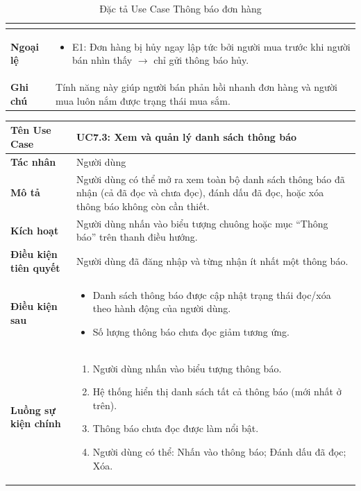 \begin{table}[H]
\begin{tabularx}{\textwidth}{|l|X|}
\begin{itemize}
\end{itemize} \\ \hline
\textbf{Ngoại lệ} & 
\begin{itemize}
    \item E1: Đơn hàng bị hủy ngay lập tức bởi người mua trước khi người bán nhìn thấy $\rightarrow$ chỉ gửi thông báo hủy.
\end{itemize} \\ \hline
\textbf{Ghi chú} & Tính năng này giúp người bán phản hồi nhanh đơn hàng và người mua luôn nắm được trạng thái mua sắm. \\ \hline
\end{tabularx}
\caption{Đặc tả Use Case Thông báo đơn hàng}
\end{table}

\begin{table}[H]
\centering
\begin{tabularx}{\textwidth}{|l|X|}
\hline
\textbf{Tên Use Case} & \textbf{UC7.3: Xem và quản lý danh sách thông báo} \\ \hline
\textbf{Tác nhân} & Người dùng \\ \hline
\textbf{Mô tả} & Người dùng có thể mở ra xem toàn bộ danh sách thông báo đã nhận (cả đã đọc và chưa đọc), đánh dấu đã đọc, hoặc xóa thông báo không còn cần thiết. \\ \hline
\textbf{Kích hoạt} & Người dùng nhấn vào biểu tượng chuông hoặc mục ``Thông báo'' trên thanh điều hướng. \\ \hline
\textbf{Điều kiện tiên quyết} & Người dùng đã đăng nhập và từng nhận ít nhất một thông báo. \\ \hline
\textbf{Điều kiện sau} & 
\begin{itemize}
    \item Danh sách thông báo được cập nhật trạng thái đọc/xóa theo hành động của người dùng.
    \item Số lượng thông báo chưa đọc giảm tương ứng.
\end{itemize} \\ \hline
\textbf{Luồng sự kiện chính} & 
\begin{enumerate}
    \item Người dùng nhấn vào biểu tượng thông báo.
    \item Hệ thống hiển thị danh sách tất cả thông báo (mới nhất ở trên).
    \item Thông báo chưa đọc được làm nổi bật.
    \item Người dùng có thể: Nhấn vào thông báo; Đánh dấu đã đọc; Xóa.

\end{enumerate}
\end{tabularx}
\end{table}
